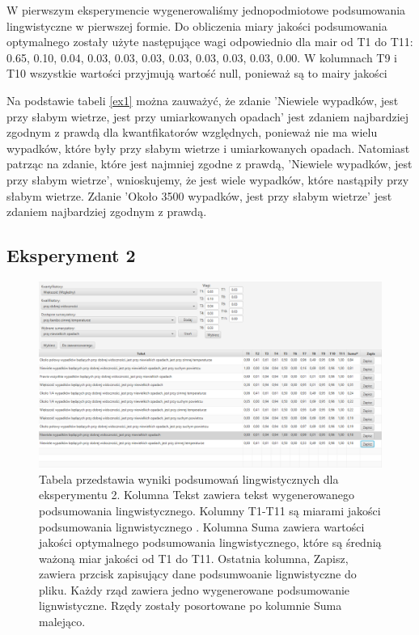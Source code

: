 \documentclass{classrep}
\begin{document}
W pierwszym eksperymencie wygenerowaliśmy jednopodmiotowe podsumowania lingwistyczne w pierwszej formie. Do obliczenia miary jakości podsumowania optymalnego zostały użyte następujące wagi odpowiednio dla mair od T1 do T11: 0.65, 0.10, 0.04, 0.03, 0.03, 0.03, 0.03, 0.03, 0.03, 0.03, 0.00. W kolumnach T9 i T10 wszystkie wartości przyjmują wartość null, ponieważ są to mairy jakości 

Na podstawie tabeli \ref{ex1} można zauważyć, że zdanie 'Niewiele wypadków, jest przy słabym wietrze, jest przy umiarkowanych opadach' jest zdaniem najbardziej zgodnym z prawdą dla kwantfikatorów względnych, ponieważ nie ma wielu wypadków, które były przy słabym wietrze i umiarkowanych opadach. Natomiast patrząc na zdanie, które jest najmniej zgodne z prawdą, 'Niewiele wypadków, jest przy słabym wietrze', wnioskujemy, że jest wiele wypadków, które nastąpiły przy słabym wietrze. Zdanie 'Około 3500 wypadków, jest przy słabym wietrze' jest zdaniem najbardziej zgodnym z prawdą. 


\newpage
\subsection{Eksperyment 2}
\label{section:ex2}
\begin{figure}[h!]
 \centering
 \includegraphics[width=15cm]{ex2.png}
 \vspace{-0.3cm}
 \caption{Tabela przedstawia wyniki podsumowań lingwistycznych dla eksperymentu 2. Kolumna Tekst zawiera tekst wygenerowanego podsumowania lingwistycznego. Kolumny T1-T11 są miarami jakości podsumowania lignwistycznego \cite{niewiadomski19}. Kolumna Suma zawiera wartości jakości optymalnego podsumowania lingwistycznego, które są średnią ważoną miar jakości od T1 do T11. Ostatnia kolumna, Zapisz, zawiera przcisk zapisujący dane podsumwoanie lignwistyczne do pliku. Każdy rząd zawiera jedno wygenerowane podsumowanie lignwistyczne. Rzędy zostały posortowane po kolumnie Suma malejąco.  }
 \label{ex2}
\end{figure}
\end{document}
